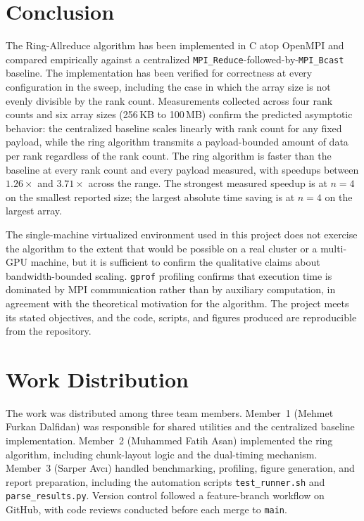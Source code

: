 \documentclass[12pt,a4paper]{article}
\begin{document}
\section{Conclusion}

The Ring-Allreduce algorithm has been implemented in C atop OpenMPI and compared empirically against a centralized \texttt{MPI\_Reduce}-followed-by-\texttt{MPI\_Bcast} baseline. The implementation has been verified for correctness at every configuration in the sweep, including the case in which the array size is not evenly divisible by the rank count. Measurements collected across four rank counts and six array sizes (256\,KB to 100\,MB) confirm the predicted asymptotic behavior: the centralized baseline scales linearly with rank count for any fixed payload, while the ring algorithm transmits a payload-bounded amount of data per rank regardless of the rank count. The ring algorithm is faster than the baseline at every rank count and every payload measured, with speedups between $1.26\times$ and $3.71\times$ across the range. The strongest measured speedup is at $n=4$ on the smallest reported size; the largest absolute time saving is at $n=4$ on the largest array.

The single-machine virtualized environment used in this project does not exercise the algorithm to the extent that would be possible on a real cluster or a multi-GPU machine, but it is sufficient to confirm the qualitative claims about bandwidth-bounded scaling. \texttt{gprof} profiling confirms that execution time is dominated by MPI communication rather than by auxiliary computation, in agreement with the theoretical motivation for the algorithm. The project meets its stated objectives, and the code, scripts, and figures produced are reproducible from the repository.

\section{Work Distribution}

The work was distributed among three team members. Member~1 (Mehmet Furkan Dalfidan) was responsible for shared utilities and the centralized baseline implementation. Member~2 (Muhammed Fatih Asan) implemented the ring algorithm, including chunk-layout logic and the dual-timing mechanism. Member~3 (Sarper Avc{\i}) handled benchmarking, profiling, figure generation, and report preparation, including the automation scripts \texttt{test\_runner.sh} and \texttt{parse\_results.py}. Version control followed a feature-branch workflow on GitHub, with code reviews conducted before each merge to \texttt{main}.
\end{document}

